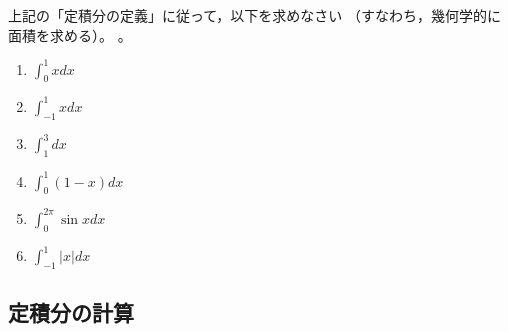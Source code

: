 \documentclass[twocolumn,11pt]{jarticle}
\begin{document}
\nexercise
上記の「定積分の定義」に従って，以下を求めなさい
（すなわち，幾何学的に面積を求める）。
。
\begin{enumerate}
\item\label{iitem:int_0^1xdx} $\displaystyle\int_0^1xdx$
\item\label{iitem:int_-1^1xdx} $\displaystyle\int_{-1}^1xdx$
\item\label{iitem:int_1^3dx} $\displaystyle\int_1^3dx$
\item\label{iitem:int_0^1(1-x)dx} $\displaystyle\int_0^1(1-x)dx$
\item\label{iitem:int_0^2pisinxdx} $\displaystyle\int_0^{2\pi} \sin x dx$
\item\label{iitem:int_-1^1|x|dx} $\displaystyle\int_{-1}^1|x|dx$
\end{enumerate}


\subsection{定積分の計算}
\end{document}
